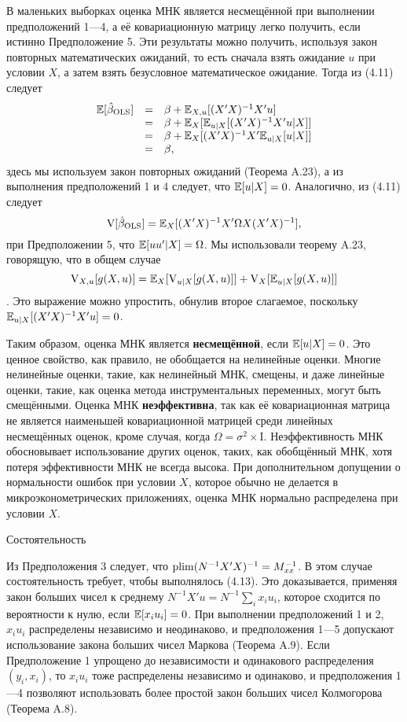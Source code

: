 В маленьких выборках оценка МНК является несмещённой при выполнении предположений 1---4,  а её ковариационную матрицу легко получить, если истинно Предположение 5. Эти результаты можно получить, используя закон повторных математических ожиданий, то есть сначала взять ожидание $u$ при условии $X$,  а затем взять безусловное математическое ожидание. Тогда из (4.11) следует
\begin{equation}
\begin{array}{rcl}
\mathbb{E}[\hat{\beta}_{\text{OLS}}]  & = & \beta+\mathbb{E}_{X,u}[(X'X)^{-1}X'u] \\
& = &  \beta+\mathbb{E}_{X}[\mathbb{E}_{u|X}[(X'X)^{-1}X'u|X]] \\
& = & \beta+\mathbb{E}_{X}[(X'X)^{-1}X'\mathbb{E}_{u|X}[u|X]] \\
& = & \beta, \\
\end{array}
\end{equation}
здесь мы используем закон повторных ожиданий (Теорема A.23), а из выполнения предположений 1 и 4 следует, что $\mathbb{E}[u|X]=0$. Аналогично, из (4.11) следует
\begin{equation}
\mathrm{V}[\hat{\beta}_{\text{OLS}}] = \mathbb{E}_{X}[(X'X)^{-1}X'\Omega X (X'X)^{-1}],
\end{equation}
при Предположении 5, что $\mathbb{E}[uu'|X]=\Omega$. Мы использовали теорему A.23, говорящую, что в общем случае 
$$\mathrm{V}_{X,u}[g(X,u)] = \mathbb{E}_X[\mathrm{V}_{u|X}[g(X,u)]] + \mathrm{V}_{X}[\mathbb{E}_{u|X}[g(X,u)]]$$.
Это выражение можно упростить, обнулив второе слагаемое, поскольку $\mathbb{E}_{u|X}[(X'X)^{-1}X'u] = 0$.

Таким образом, оценка МНК является \textbf{несмещённой}, если $\mathbb{E}[u|X]=0$. Это ценное свойство, как правило, не обобщается на нелинейные оценки. Многие нелинейные оценки, такие, как нелинейный МНК, смещены, и даже линейные оценки, такие, как оценка метода инструментальных переменных, могут быть смещёнными. Оценка МНК \textbf{неэффективна}, так как её ковариационная матрица не является наименьшей ковариационной матрицей среди линейных несмещённых оценок, кроме случая, когда $\Omega = \sigma^2 \times \mathrm{I}$. Неэффективность МНК обосновывает использование других оценок, таких, как обобщённый МНК, хотя потеря эффективности МНК не всегда высока. При дополнительном допущении о нормальности ошибок при условии $X$, которое обычно не делается в микроэконометрических приложениях, оценка МНК нормально распределена при условии $X$.

\begin{center}
Состоятельность
\end{center}
Из Предположения 3 следует, что $\mathrm{plim } (N^{-1} X'X)^{-1}=M_{xx}^{-1}$. В этом случае состоятельность требует, чтобы выполнялось (4.13). Это доказывается, применяя закон больших чисел к среднему $N^{-1}X'u=N^{-1}\sum_i x_i u_i$, которое сходится по вероятности к нулю, если $\mathbb{E}[x_i u_i]=0$. При выполнении предположений 1 и 2, $x_i u_i$ распределены независимо и неодинаково, и предположения 1---5 допускают использование закона больших чисел Маркова (Теорема A.9). Если Предположение 1 упрощено до независимости и одинакового распределения $(y_i,x_i)$, то $x_i u_i$ тоже распределены независимо и одинаково, и предположения 1---4 позволяют использовать более простой закон больших чисел Колмогорова (Теорема A.8).

